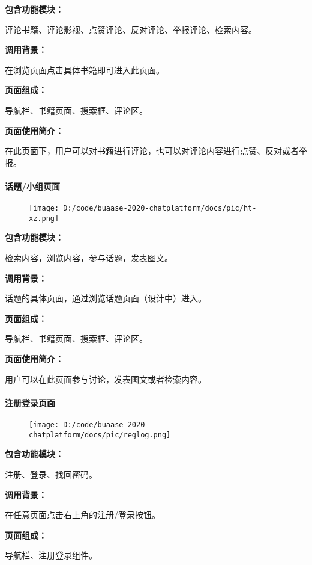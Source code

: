 \documentclass[
]{article}
\begin{document}
\textbf{包含功能模块：}

评论书籍、评论影视、点赞评论、反对评论、举报评论、检索内容。

\textbf{调用背景：}

在浏览页面点击具体书籍即可进入此页面。

\textbf{页面组成：}

导航栏、书籍页面、搜索框、评论区。

\textbf{页面使用简介：}

在此页面下，用户可以对书籍进行评论，也可以对评论内容进行点赞、反对或者举报。

\hypertarget{header-n1321}{%
\paragraph{话题/小组页面}\label{header-n1321}}

\begin{figure}
\centering
\texttt{[image: D:/code/buaase-2020-chatplatform/docs/pic/ht-xz.png]}
\caption{}
\end{figure}

\textbf{包含功能模块：}

检索内容，浏览内容，参与话题，发表图文。

\textbf{调用背景：}

话题的具体页面，通过浏览话题页面（设计中）进入。

\textbf{页面组成：}

导航栏、书籍页面、搜索框、评论区。

\textbf{页面使用简介：}

用户可以在此页面参与讨论，发表图文或者检索内容。

\hypertarget{header-n1331}{%
\paragraph{注册登录页面}\label{header-n1331}}

\begin{figure}
\centering
\texttt{[image: D:/code/buaase-2020-chatplatform/docs/pic/reglog.png]}
\caption{}
\end{figure}

\textbf{包含功能模块：}

注册、登录、找回密码。

\textbf{调用背景：}

在任意页面点击右上角的注册/登录按钮。

\textbf{页面组成：}

导航栏、注册登录组件。
\end{document}
